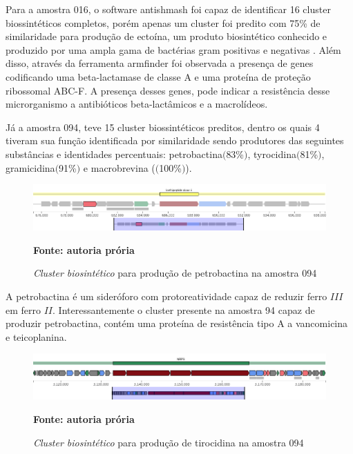 Para a amostra 016, o software antishmash foi capaz de identificar 16 cluster biossintéticos completos, porém
apenas um cluster foi predito com 75\% de similaridade para produção de ectoína, um produto biosintético
conhecido e produzido por uma ampla gama de bactérias gram positivas e negativas \cite{stoveken2011specialized}.
Além disso, através da ferramenta armfinder foi observada a presença de genes codificando uma beta-lactamase de classe A e uma proteína de
proteção ribossomal ABC-F. A presença desses genes, pode indicar a resistência desse microrganismo a antibióticos beta-lactâmicos
e a macrolídeos.  

Já a amostra 094, teve 15 cluster biossintéticos preditos, dentro os quais 4 tiveram sua função identificada
por similaridade sendo produtores das seguintes substâncias e identidades percentuais: petrobactina$($83\%$)$, 
tyrocidina$($81\%$)$, gramicidina$($91\%$)$ e macrobrevina ($($100\%$)$). 


 \begin{figure}[H]
	\caption{\textit{Cluster biosintético} para produção de petrobactina na amostra 094}
	\label{fig:quast_16}
	\centering
		\includegraphics[width=0.8\linewidth]{imagens/antismash/094regiao1.png} \\
	\centering
    \begin{small}\textbf{Fonte: autoria prória}\end{small}
\end{figure}
\vspace{\floatsep}

A petrobactina é um sideróforo com protoreatividade capaz de reduzir ferro $III$ em 
ferro $II$\cite{barbeau2002petrobactin}. Interessantemente o cluster presente na amostra 94
capaz de produzir petrobactina, contém uma proteína de resistência tipo A a vancomicina e teicoplanina.

\begin{figure}[H]
	\caption{\textit{Cluster biosintético} para produção de tirocidina na amostra 094}
	\label{fig:quast_16}
	\centering
		\includegraphics[width=0.8\linewidth]{imagens/antismash/094regiao2.png} \\
	\centering
    \begin{small}\textbf{Fonte: autoria prória}\end{small}
\end{figure}
\vspace{\floatsep}


